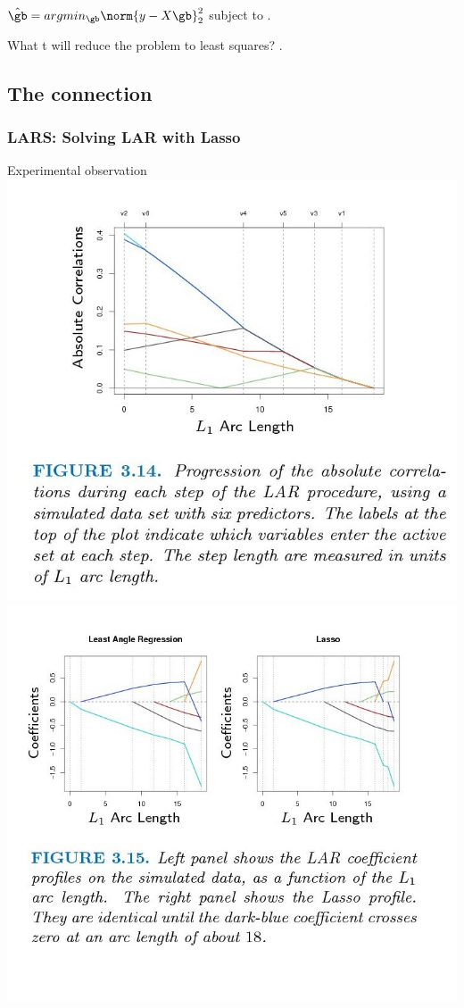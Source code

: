 \documentclass{beamer}
\begin{document}
\begin{frame}
\\
$\hat{\gb} = argmin_{\gb} \norm{y-X\gb}_{2}^{2}$ subject to .
\begin{itemize}
\pitem {} What t will reduce the problem to least squares?
\pitem {}.
\end{itemize}
\end{frame}

\subsection{The connection}
\begin{frame}
\frametitle{LARS: Solving LAR with Lasso}
\begin{itemize}
\pitem Experimental observation\\
\includegraphics[scale=0.15]{images/figures3-13.jpg}
\includegraphics[scale=0.20]{images/figures3-14.jpg}

\end{itemize}
\end{frame}
\end{document}
